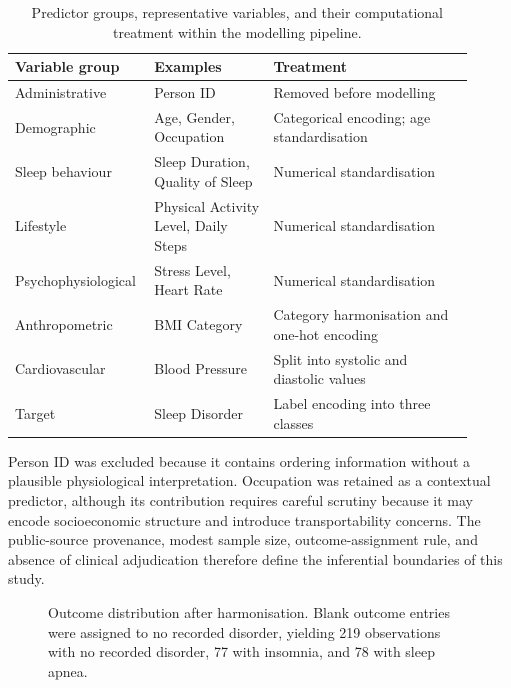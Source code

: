 \documentclass{elektr}
\begin{document}
\begin{table}[ht]
\centering
\caption{Predictor groups, representative variables, and their computational treatment within the modelling pipeline.}
\label{tab:variables}
\small
\begin{tabular}{L{0.24\linewidth}L{0.25\linewidth}L{0.42\linewidth}}
\toprule
Variable group & Examples & Treatment \\
\midrule
Administrative & Person ID & Removed before modelling \\
Demographic & Age, Gender, Occupation & Categorical encoding; age standardisation \\
Sleep behaviour & Sleep Duration, Quality of Sleep & Numerical standardisation \\
Lifestyle & Physical Activity Level, Daily Steps & Numerical standardisation \\
Psychophysiological & Stress Level, Heart Rate & Numerical standardisation \\
Anthropometric & BMI Category & Category harmonisation and one-hot encoding \\
Cardiovascular & Blood Pressure & Split into systolic and diastolic values \\
Target & Sleep Disorder & Label encoding into three classes \\
\bottomrule
\end{tabular}
\end{table}

Person ID was excluded because it contains ordering information without a plausible physiological interpretation. Occupation was retained as a contextual predictor, although its contribution requires careful scrutiny because it may encode socioeconomic structure and introduce transportability concerns. The public-source provenance, modest sample size, outcome-assignment rule, and absence of clinical adjudication therefore define the inferential boundaries of this study.

\begin{figure}[ht]
\centering
{}
\caption{Outcome distribution after harmonisation. Blank outcome entries were assigned to no recorded disorder, yielding 219 observations with no recorded disorder, 77 with insomnia, and 78 with sleep apnea.}
\label{fig:distribution}
\end{figure}
\end{document}
